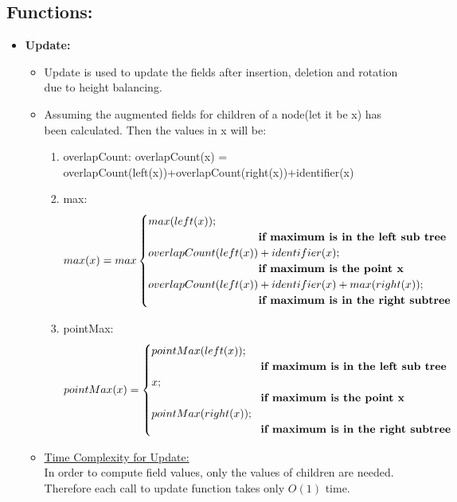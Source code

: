 \documentclass[pdftex,a4paper,12pt]{report}
\begin{document}
\subsection{Functions:}
  \begin{itemize}
\item \textbf{Update:}
  \begin{itemize}
    \item Update is used to update the fields after insertion, deletion and rotation due to height balancing.
    \item Assuming the augmented fields for children of a node(let it be x) has been calculated. Then the values in x will be:
      \begin{enumerate}
	\item overlapCount:
	  overlapCount(x) = \\\makebox[100pt]{}overlapCount(left(x))+overlapCount(right(x))+identifier(x)
	\item max:
	\begin{align*}
	      max(x) = max \begin{cases}
			max(left(x)); \\\makebox[100pt]{}\textbf{if maximum is in the left sub tree}	\\
		overlapCount(left(x)) + identifier(x);  \\\makebox[100pt]{}\textbf{if maximum is the point x}	\\
	overlapCount(left(x)) + identifier(x) + max(right(x)); \\\makebox[100pt]{}\textbf{if maximum is in the right subtree}	\\
		\end{cases}
	\end{align*}
	\item pointMax:
	\begin{align*}
	    pointMax(x) = \begin{cases}
			pointMax(left(x)); \\\makebox[100pt]{} \textbf{if maximum is in the left sub tree}	\\
		x; \texttt{	} \\\makebox[100pt]{}\textbf{if maximum is the point x}	\\
	pointMax(right(x)); \\\makebox[100pt]{} \textbf{if maximum is in the right subtree}	\\
		\end{cases}
	 \end{align*}
      \end{enumerate}
    \item \underline{Time Complexity for Update:}\\
In order to compute field values, only the values of children are needed. Therefore each call to update function takes only $O(1)$ time.
  \end{itemize}


\end{itemize}
\end{document}
